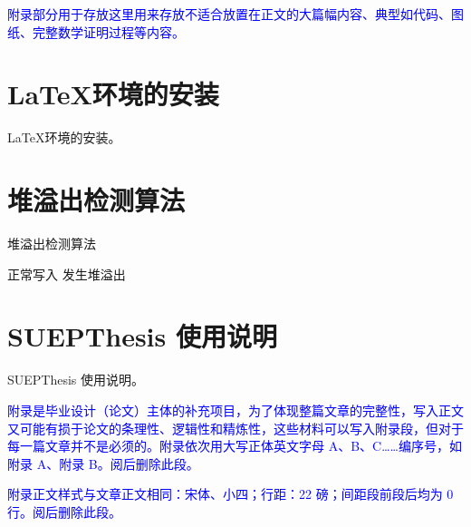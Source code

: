%
%
%
%
%

\begin{appendices}
    
    \textcolor{blue}{附录部分用于存放这里用来存放不适合放置在正文的大篇幅内容、典型如代码、图纸、完整数学证明过程等内容。}
  
  
    \section{\LaTeX 环境的安装}
    \LaTeX 环境的安装。

    \newpage
    \section{堆溢出检测算法}
    \begin{algorithm}[h]
        \caption{堆溢出检测算法}\label{alg:ovf}
        \begin{algorithmic}[1]
                \STATE 正常写入
                \STATE 发生堆溢出
            \ENDIF
        \end{algorithmic}
    \end{algorithm}
    
    \newpage
    \section{SUEPThesis 使用说明}
    SUEPThesis 使用说明。
  
    \textcolor{blue}{附录是毕业设计（论文）主体的补充项目，为了体现整篇文章的完整性，写入正文又可能有损于论文的条理性、逻辑性和精炼性，这些材料可以写入附录段，但对于每一篇文章并不是必须的。附录依次用大写正体英文字母 A、B、C……编序号，如附录 A、附录 B。阅后删除此段。}
  
    \textcolor{blue}{附录正文样式与文章正文相同：宋体、小四；行距：22 磅；间距段前段后均为 0 行。阅后删除此段。}
  
\end{appendices}